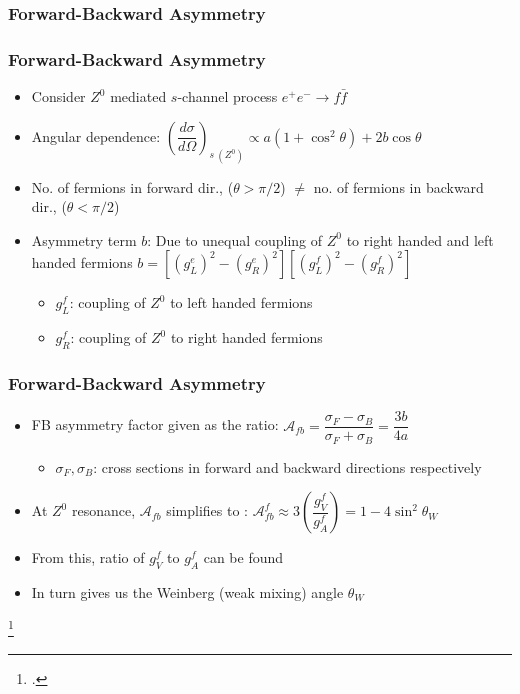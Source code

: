 \documentclass[10pt]{beamer}
\begin{document}
\subsubsection{Forward-Backward Asymmetry}
\begin{frame}
\frametitle{Forward-Backward Asymmetry}
\begin{itemize}
\item Consider $Z^{0}$ mediated $s$-channel process $e^{+}e^{-}\rightarrow f\bar{f}$
\item Angular dependence:
\vspace{0.5em}
$\left(\dfrac{d\sigma}{d\Omega}\right)_{s\ (Z^{0})}\propto a(1+\cos^{2}\theta) + 2b\cos\theta$
\item No. of fermions in forward dir., ($\theta>\pi /2$) $\neq$ no. of fermions in backward dir., ($\theta<\pi /2$)
\item Asymmetry term $b$: Due to unequal coupling of $Z^{0}$ to right handed and left handed fermions
\vspace{0.5em}
$b=\left[\left(g_{L}^{e}\right)^{2}-\left(g_{R}^{e}\right)^{2}\right]\left[\left(g_{L}^{f}\right)^{2}-\left(g_{R}^{f}\right)^{2}\right]$
\begin{itemize}
\item $g_{L}^{f}$: coupling of $Z^{0}$ to left handed fermions
\item $g_{R}^{f}$: coupling of $Z^{0}$ to right handed fermions
\end{itemize}
\end{itemize}
\end{frame}

\begin{frame}
\frametitle{Forward-Backward Asymmetry}
\begin{itemize}
\item FB asymmetry factor given as the ratio:
\vspace{0.5em}
$\mathcal{A}_{fb}=\dfrac{\sigma_{F}-\sigma_{B}}{\sigma_{F}+\sigma_{B}}=\dfrac{3b}{4a}$
\begin{itemize}
\item $\sigma_{F}, \sigma_{B}$: cross sections in forward and backward directions respectively
\end{itemize}
\item At $Z^{0}$  resonance, $\mathcal{A}_{fb}$ simplifies to \footnotemark{}:
\vspace{0.5em}
$\mathcal{A}_{fb}^{f}\approx 3\left(\dfrac{g_{V}^{f}}{g_{A}^{f}}\right)=1-4\sin^{2}\theta_{W}$
\item From this, ratio of $g_{V}^{f}$ to $g_{A}^{f}$ can be found
\item In turn gives us the Weinberg (weak mixing) angle $\theta_{W}$
\end{itemize}
\footcitetext{thomson_2013}
\end{frame}
\end{document}
